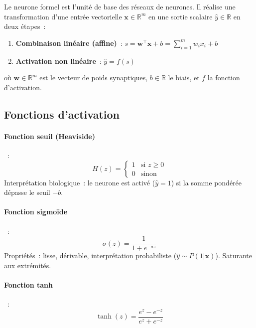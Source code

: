 \documentclass[a4paper,11pt]{article}
\theoremstyle{definition}
\theoremstyle{remark}
\begin{document}
Le neurone formel est l'unit\'e de base des r\'eseaux de neurones.
Il r\'ealise une transformation d'une entr\'ee vectorielle
$\mathbf{x} \in \mathbb{R}^m$ en une sortie scalaire
$\hat{y} \in \mathbb{R}$ en deux \'etapes~:

\begin{enumerate}
  \item \textbf{Combinaison lin\'eaire (affine)}~:
    $\displaystyle s = \mathbf{w}^\intercal \mathbf{x} + b =
    \sum_{i=1}^m w_i x_i + b$
  \item \textbf{Activation non lin\'eaire}~:
    $\hat{y} = f(s)$
\end{enumerate}

\noindent o\`u $\mathbf{w} \in \mathbb{R}^m$ est le vecteur de
poids synaptiques, $b \in \mathbb{R}$ le biais, et $f$ la fonction
d'activation.

\subsection{Fonctions d'activation}

\paragraph{Fonction seuil (Heaviside)}~:
\begin{equation}
  H(z) = \begin{cases}
    1 & \text{si } z \geq 0 \\
    0 & \text{sinon}
  \end{cases}
\end{equation}
Interpr\'etation biologique~: le neurone est activ\'e
($\hat{y}=1$) si la somme pond\'er\'ee d\'epasse le seuil $-b$.

\paragraph{Fonction sigmo\"ide}~:
\begin{equation}
  \sigma(z) = \frac{1}{1 + e^{-a z}}
\end{equation}
Propri\'et\'es~: lisse, d\'erivable, interpr\'etation probabiliste
($\hat{y} \sim P(1|\mathbf{x})$). Saturante aux extr\'emit\'es.

\paragraph{Fonction tanh}~:
\begin{equation}
  \tanh(z) = \frac{e^{z} - e^{-z}}{e^{z} + e^{-z}}
\end{equation}
\newpage
\end{document}
